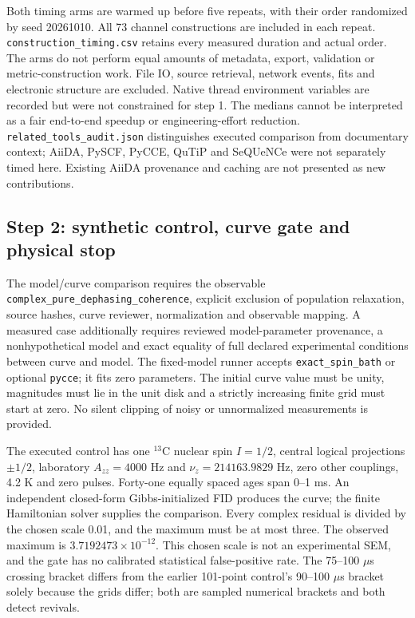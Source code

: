 \documentclass[10pt,a4paper]{article}
\newcommand{\code}[1]{\texttt{#1}}
\begin{document}
Both timing arms are warmed up before five repeats, with their order randomized by seed 20261010. All 73 channel constructions are included in each repeat. \code{construction\_timing.csv} retains every measured duration and actual order. The arms do not perform equal amounts of metadata, export, validation or metric-construction work. File IO, source retrieval, network events, fits and electronic structure are excluded. Native thread environment variables are recorded but were not constrained for step 1. The medians cannot be interpreted as a fair end-to-end speedup or engineering-effort reduction. \code{related\_tools\_audit.json} distinguishes executed comparison from documentary context; AiiDA, PySCF, PyCCE, QuTiP and SeQUeNCe were not separately timed here. Existing AiiDA provenance and caching are not presented as new contributions.

\subsection{Step 2: synthetic control, curve gate and physical stop}
The model/curve comparison requires the observable \code{complex\_pure\_dephasing\_coherence}, explicit exclusion of population relaxation, source hashes, curve reviewer, normalization and observable mapping. A measured case additionally requires reviewed model-parameter provenance, a nonhypothetical model and exact equality of full declared experimental conditions between curve and model. The fixed-model runner accepts \code{exact\_spin\_bath} or optional \code{pycce}; it fits zero parameters. The initial curve value must be unity, magnitudes must lie in the unit disk and a strictly increasing finite grid must start at zero. No silent clipping of noisy or unnormalized measurements is provided.

The executed control has one $^{13}$C nuclear spin $I=1/2$, central logical projections $\pm1/2$, laboratory $A_{zz}=4000$ Hz and $\nu_z=214163.9829$ Hz, zero other couplings, 4.2 K and zero pulses. Forty-one equally spaced ages span 0--1 ms. An independent closed-form Gibbs-initialized FID produces the curve; the finite Hamiltonian solver supplies the comparison. Every complex residual is divided by the chosen scale 0.01, and the maximum must be at most three. The observed maximum is $3.7192473\times10^{-12}$. This chosen scale is not an experimental SEM, and the gate has no calibrated statistical false-positive rate. The 75--100 $\mu$s crossing bracket differs from the earlier 101-point control's 90--100 $\mu$s bracket solely because the grids differ; both are sampled numerical brackets and both detect revivals.
\end{document}
